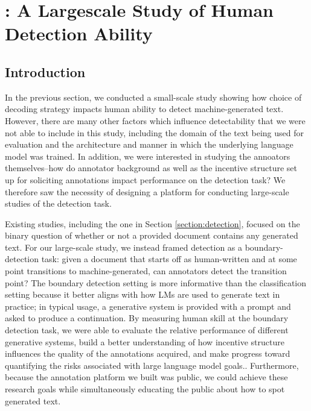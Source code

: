 \section{\ROFT: A Largescale Study of Human Detection Ability}
\label{section:roft}

\subsection{Introduction}
In the previous section, we conducted a small-scale study showing how choice of decoding strategy impacts human ability to detect machine-generated text.
However, there are many other factors which influence detectability that we were not able to include in this study, including the domain of the text being used for evaluation and the architecture and manner in which the underlying language model was trained.
In addition, we were interested in studying the annoators themselves--how do annotator background as well as the incentive structure set up for soliciting annotations impact performance on the detection task?
We therefore saw the necessity of designing a platform for conducting large-scale studies of the detection task.

Existing studies, including the one in Section \ref{section:detection}, focused on the binary question of whether or not a provided document contains any generated text.
For our large-scale study, we instead framed detection as a boundary-detection task: given a document that starts off as human-written and at some point transitions to machine-generated, can annotators detect the transition point?
The boundary detection setting is more informative than the classification setting because it better aligns with how LMs are used to generate text in practice; in typical usage, a generative system is provided with a prompt and asked to produce a continuation.
By measuring human skill at the boundary detection task, we were able to evaluate the relative performance of different generative systems, build a better understanding of how incentive structure influences the quality of the annotations acquired, and make progress toward quantifying the risks associated with large language model goals..
Furthermore, because the annotation platform we built was public, we could achieve these research goals while simultaneously educating the public about how to spot generated text. 

